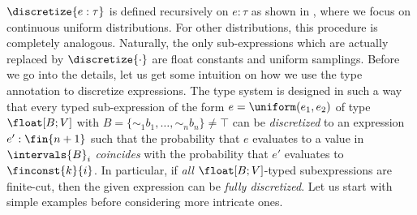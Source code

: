 $\discretize{e : \tau}$ is defined recursively on $e : \tau$ as shown in , where we focus on continuous uniform distributions. For other distributions, this procedure is completely analogous. Naturally, the only sub-expressions which are actually replaced by $\discretize{\cdot}$ are float constants and uniform samplings. Before we go into the details, let us get some intuition on how we use the type annotation to discretize expressions. The type system is designed in such a way that every typed sub-expression of the form 
$e = \uniform(e_1, e_2 )$ of type  $\float[B;V]$ with $B=\{\sim_1\!\!b_1, \ldots, \sim_n\!\!b_n\} \neq \top$ 
%
can be \emph{discretized} to an expression $e' : \fin{n+1}$ such that 
%
the probability that $e$ evaluates to a value in $\intervals{B}_i$ \emph{coincides} with the probability that $e'$ evaluates to $\finconst{k}{i}$. %
In particular, if \emph{all} $\float[B;V]$-typed subexpressions are finite-cut, then the given expression can be \emph{fully discretized}.  Let us start with simple examples before considering more intricate ones.
%

